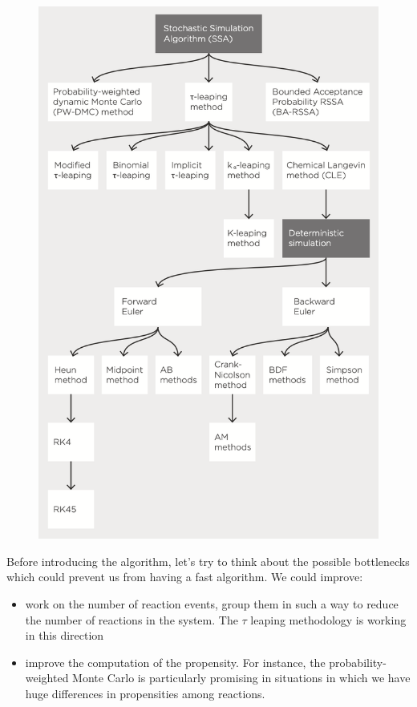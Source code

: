 \begin{figure}
\centering
\includegraphics{04_images/SSA_tree.png}
\end{figure}

Before introducing the algorithm, let's try to think about the possible
bottlenecks which could prevent us from having a fast algorithm. We
could improve:

\begin{itemize}
\tightlist
\item
  work on the number of reaction events, group them in such a way to
  reduce the number of reactions in the system. The $\tau$ leaping
  methodology is working in this direction
\item
  improve the computation of the propensity. For instance, the
  probability-weighted Monte Carlo is particularly promising in
  situations in which we have huge differences in propensities among
  reactions.
\end{itemize}

